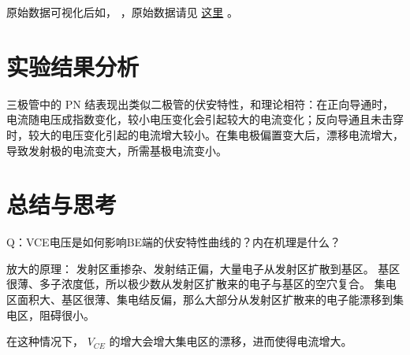 \documentclass[lang=cn,11pt,a4paper,cite=authoryear]{elegantpaper}
\begin{document}
原始数据可视化后如， ，原始数据请见 \href{https://github.com/PannenetsF/Mirco-Electronic-Device-Experiment/tree/main/homework/hw07/01led}{这里} 。



\section{实验结果分析}

三极管中的 PN 结表现出类似二极管的伏安特性，和理论相符：在正向导通时，电流随电压成指数变化，较小电压变化会引起较大的电流变化；反向导通且未击穿时，较大的电压变化引起的电流增大较小。在集电极偏置变大后，漂移电流增大，导致发射极的电流变大，所需基极电流变小。

\section{总结与思考}

Q：VCE电压是如何影响BE端的伏安特性曲线的？内在机理是什么？

放大的原理：
发射区重掺杂、发射结正偏，大量电子从发射区扩散到基区。
基区很薄、多子浓度低，所以极少数从发射区扩散来的电子与基区的空穴复合。
集电区面积大、基区很薄、集电结反偏，那么大部分从发射区扩散来的电子能漂移到集电区，阻碍很小。

在这种情况下， \(V_{CE}\) 的增大会增大集电区的漂移，进而使得电流增大。

\end{document}
